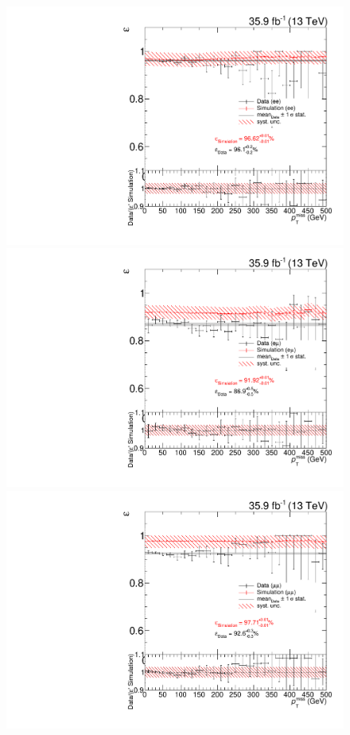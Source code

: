 \begin{figure}[htb]
 \centering
 \includegraphics[width=\pairwidth]{figures/triggerStudies/efficiency_dataHT_trigDilep_ptcuts_EE_met}
 \includegraphics[width=\pairwidth]{figures/triggerStudies/efficiency_dataHT_trigDilep_ptcuts_EM_met}
 \includegraphics[width=\pairwidth]{figures/triggerStudies/efficiency_dataHT_trigDilep_ptcuts_MM_met}

\end{figure}
